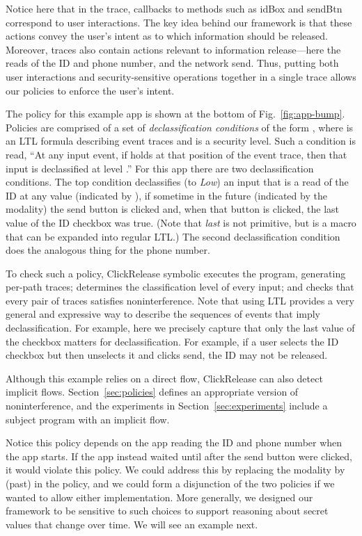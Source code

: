 \documentclass{llncs}
\newcommand{\code}[1]{\textsf{#1}} \newcommand{\bcode}[1]{\texttt{#1}}
\newcommand{\toolname}{ClickRelease\xspace}
\begin{document}
Notice here that in the trace, callbacks to methods such as
\code{idBox} and \code{sendBtn} correspond to user
interactions. The key idea behind our framework is that these actions
convey the user's intent as to which information should be
released. Moreover, traces also contain actions relevant to
information release---here the reads of the ID and phone number, and
the network send. Thus, putting both user interactions and
security-sensitive operations together in a single trace allows
our policies to enforce the user's intent.

The policy for
this example app is shown at the bottom of Fig.~\ref{fig:app-bump}.
Policies are comprised of a set of \emph{declassification
  conditions} of the form , where  is an LTL
formula describing event traces and  is a security level.  Such a
condition is read, ``At any input event, if  holds at that
position of the event trace, then that input is declassified at level
.''  For this app there are two declassification conditions. The
top condition declassifies (to \emph{Low}) an input that is a
read of the ID at any value (indicated by ), if
sometime in the future (indicated by the  modality) the send
button is clicked and, when that button is clicked, the last value of
the ID checkbox was \code{true}. (Note that \emph{last} is not
primitive, but is a macro that can be expanded into regular LTL.)  The
second declassification condition does the analogous thing for the
phone number.

To check such a policy, \toolname{} symbolic executes the program,
generating per-path traces; determines the classification level of every input; and
checks that every pair of traces satisfies noninterference.
Note that using LTL provides a very general and
expressive way to describe the sequences of events that imply
declassification. For example, here we precisely capture that
only the last value of the checkbox matters for declassification. For
example, if a user selects the ID checkbox but then unselects it
and clicks send, the ID may not be released.

Although this example relies on a direct flow, \toolname{} can also
detect implicit flows. Section~\ref{sec:policies} defines an
appropriate version of noninterference, and the experiments in
Section~\ref{sec:experiments} include a subject program with an
implicit flow.



Notice this policy depends on the app reading the ID
and phone number when the app starts. If the app instead
waited until after the send button were clicked, it would violate this
policy. We could address this by replacing the  modality by
 (past) in the policy, and we could form a disjunction of the
two policies if we wanted to allow either implementation. More generally, we
designed our framework to be sensitive to such choices to
support  reasoning about secret
values that change over time. We will see an
example next.
\end{document}
